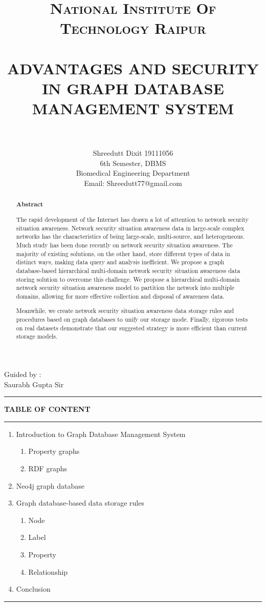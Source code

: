 \documentclass[paper=a4, fontsize=11pt]{scrartcl}
\title{
		\usefont{OT1}{bch}{b}{n}
		\normalfont \normalsize \textsc{National Institute Of Technology Raipur} \\ [25pt]
		\horrule{0.5pt} \\[0.4cm]
		\huge ADVANTAGES AND SECURITY IN GRAPH DATABASE MANAGEMENT SYSTEM  \\
		\horrule{2pt} \\[0.5cm]
}
\author{
        Shreedutt Dixit 19111056\\6th Semester, 
        DBMS\\ Biomedical Engineering Department\\	
        Email: Shreedutt77@gmail.com
        \normalsize
}
\date{}
\numberwithin{equation}{section}		%
\numberwithin{figure}{section}			%
\numberwithin{table}{section}				%
\begin{document}
\maketitle
\begin{flushright}
    Guided by :\\
    Saurabh Gupta Sir
\end{flushright}

\noindent\rule{\textwidth}{1pt}
\begin{abstract}
    \begin{center}
        \Large{\textbf{Abstract}}\\
    \end{center}
    \Large { The rapid development of the Internet has drawn a lot of attention to network security situation awareness. Network security situation awareness data in large-scale complex networks has the characteristics of being large-scale, multi-source, and heterogeneous. Much study has been done recently on network security situation awareness. The majority of existing solutions, on the other hand, store different types of data in distinct ways, making data query and analysis inefficient.
    \newpage 
    We propose a graph database-based hierarchical multi-domain network security situation awareness data storing solution to overcome this challenge. We propose a hierarchical multi-domain network security situation awareness model to partition the network into multiple domains, allowing for more effective collection and disposal of awareness data.
    
    Meanwhile, we create network security situation awareness data storage rules and procedures based on graph databases to unify our storage mode. Finally, rigorous tests on real datasets demonstrate that our suggested strategy is more efficient than current storage models.}
\end{abstract}


\newpage
\textbf{TABLE OF CONTENT}\\
\rule{\textwidth}{1pt}
\begin{enumerate}
    \item Introduction to Graph Database Management System
    \begin{enumerate}
        \item Property graphs
        \item RDF graphs
    \end{enumerate}
    \item Neo4j graph database
    \item Graph database-based data storage rules
    \begin{enumerate}
        \item Node
        \item Label
        \item Property
        \item Relationship
    \end{enumerate}
    \item Conclusion
\end{enumerate}
\rule{\textwidth}{1pt}
\newpage
\Large
\end{document}
